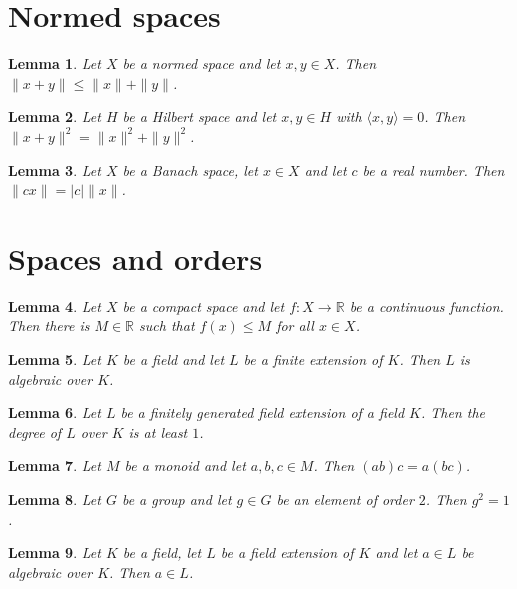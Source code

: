 \documentclass{article}
\newtheorem{lemma}{Lemma}
\begin{document}
\section{Normed spaces}

\begin{lemma}\label{triangle}
Let $X$ be a normed space and let $x,y\in X$. Then $\|x+y\|\le\|x\|+\|y\|$.
\end{lemma}

\begin{lemma}\label{pythagoras}
Let $H$ be a Hilbert space and let $x,y\in H$ with $\langle x,y\rangle=0$. Then $\|x+y\|^2=\|x\|^2+\|y\|^2$.
\end{lemma}

\begin{lemma}\label{homogeneous}
Let $X$ be a Banach space, let $x\in X$ and let $c$ be a real number. Then $\|cx\|=|c|\|x\|$.
\end{lemma}

\section{Spaces and orders}

\begin{lemma}\label{bounded}
Let $X$ be a compact space and let $f\colon X\to\mathbb{R}$ be a continuous function. Then there is $M\in\mathbb{R}$ such that $f(x)\le M$ for all $x\in X$.
\end{lemma}

\begin{lemma}\label{finite-extension}
Let $K$ be a field and let $L$ be a finite extension of $K$. Then $L$ is algebraic over $K$.
\end{lemma}

\begin{lemma}\label{degree}
Let $L$ be a finitely generated field extension of a field $K$. Then the degree of $L$ over $K$ is at least $1$.
\end{lemma}

\begin{lemma}\label{monoid}
Let $M$ be a monoid and let $a,b,c\in M$. Then $(ab)c=a(bc)$.
\end{lemma}

\begin{lemma}\label{order-two}
Let $G$ be a group and let $g\in G$ be an element of order $2$. Then $g^2=1$.
\end{lemma}

\begin{lemma}\label{algebraic}
Let $K$ be a field, let $L$ be a field extension of $K$ and let $a\in L$ be algebraic over $K$. Then $a\in L$.
\end{lemma}
\end{document}
